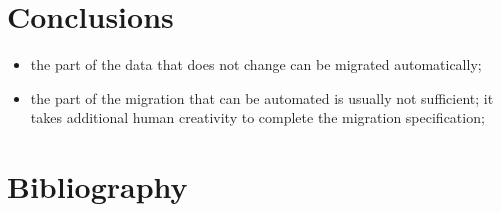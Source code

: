 \documentclass{elsarticle}
\begin{document}
\section{Conclusions}
\begin{itemize}
   \item the part of the data that does not change can be migrated automatically;
   \item the part of the migration that can be automated is usually not sufficient;
         it takes additional human creativity to complete the migration specification;
\end{itemize}
\section{Bibliography}


\end{document}
